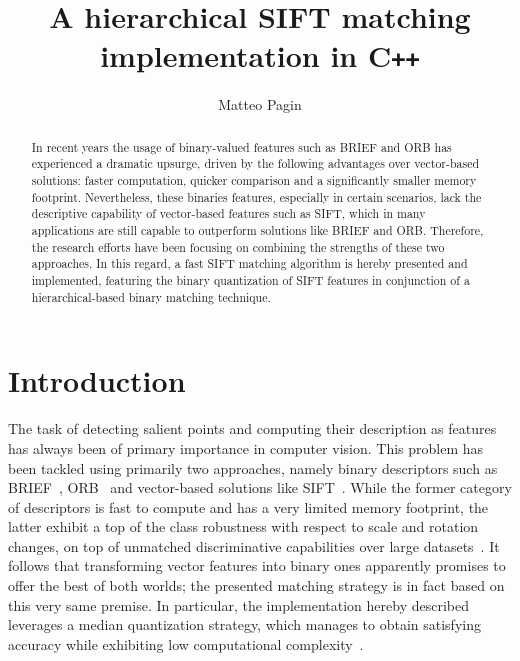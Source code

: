 \documentclass[a4paper, 11pt, oneside]{article}
\date{}
\begin{document}
\title{\vspace{-1.0cm}\huge \textbf{A hierarchical SIFT matching \\ implementation in C\texttt{++}} }
\author[1]{\Large Matteo Pagin}

\maketitle

\thispagestyle{empty}

\begin{abstract}
  In recent years the usage of binary-valued features such as BRIEF and ORB has experienced a dramatic upsurge, driven by the following advantages over vector-based solutions: faster computation, quicker comparison and a significantly smaller memory footprint. Nevertheless, these binaries features, especially in certain scenarios, lack the descriptive capability of vector-based features such as SIFT, which in many applications are still capable to outperform solutions like BRIEF and ORB. Therefore, the research efforts have been focusing on combining the strengths of these two approaches. In this regard, a fast SIFT matching algorithm is hereby presented and implemented, featuring the binary quantization of SIFT features in conjunction of a hierarchical-based binary matching technique.
\end{abstract}

\section*{Introduction}
The task of detecting salient points and computing their description as features has always been of primary importance in computer vision. This problem has been tackled using primarily two approaches, namely binary descriptors such as BRIEF~\cite{calonder2010brief}, ORB~\cite{rublee2011orb} and vector-based solutions like SIFT~\cite{lowe2004distinctive}. While the former category of descriptors is fast to compute and has a very limited memory footprint, the latter exhibit a top of the class robustness with respect to scale and rotation changes, on top of unmatched discriminative capabilities over large datasets~\cite{grauman2005efficient, karami2017image}. It follows that transforming vector features into binary ones apparently promises to offer the best of both worlds; the presented matching strategy is in fact based on this very same premise. In particular, the implementation hereby described leverages a median quantization strategy, which manages to obtain satisfying accuracy while exhibiting low computational complexity~\cite{peker2011binary}.
\end{document}
